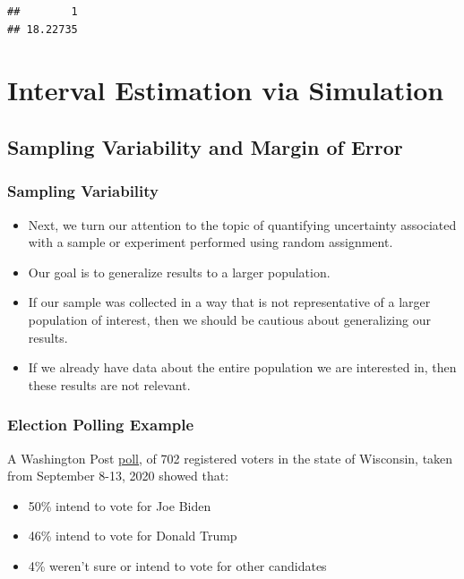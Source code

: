\documentclass[]{book}
\providecommand{\tightlist}{%
  \setlength{\itemsep}{0pt}\setlength{\parskip}{0pt}}
\begin{document}
\begin{verbatim}
##        1 
## 18.22735
\end{verbatim}

\chapter{Interval Estimation via
Simulation}\label{interval-estimation-via-simulation}

\section{Sampling Variability and Margin of
Error}\label{sampling-variability-and-margin-of-error}

\subsection{Sampling Variability}\label{sampling-variability}

\begin{itemize}
\item
  Next, we turn our attention to the topic of quantifying uncertainty
  associated with a sample or experiment performed using random
  assignment.
\item
  Our goal is to generalize results to a larger population.
\item
  If our sample was collected in a way that is not representative of a
  larger population of interest, then we should be cautious about
  generalizing our results.
\item
  If we already have data about the entire population we are interested
  in, then these results are not relevant.
\end{itemize}

\subsection{Election Polling Example}\label{election-polling-example}

A Washington Post
\href{https://www.washingtonpost.com/context/sept-8-13-2020-washington-post-abc-news-poll-of-minnesota-and-wisconsin/8e5dbd4b-4746-4e45-821e-eb8c8645d5c1/}{poll},
of 702 registered voters in the state of Wisconsin, taken from September
8-13, 2020 showed that:

\begin{itemize}
\tightlist
\item
  50\% intend to vote for Joe Biden\\
\item
  46\% intend to vote for Donald Trump\\
\item
  4\% weren't sure or intend to vote for other candidates
\end{itemize}
\end{document}
